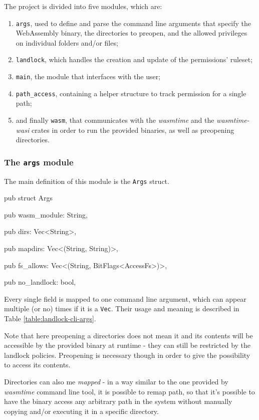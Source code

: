The project is divided into five modules, which are:
\begin{enumerate}
  \item \texttt{args}, used to define and parse the command line arguments that specify the WebAssembly binary,
        the directories to preopen, and the allowed privileges on individual folders and/or files;
  \item \texttt{landlock}, which handles the creation and update of the permissions' ruleset;
  \item \texttt{main}, the module that interfaces with the user;
  \item \texttt{path\_access}, containing a helper structure to track permission for a single path;
  \item and finally \texttt{wasm}, that communicates with the \textit{wasmtime} and the \textit{wasmtime-wasi} crates
        in order to run the provided binaries, as well as preopening directories.
\end{enumerate}

\subsubsection{The \texttt{args} module}

The main definition of this module is the \texttt{Args} struct.

\begin{code}[language=rust]
  pub struct Args {
    pub wasm_module: String,

    pub dirs: Vec<String>,

    pub mapdirs: Vec<(String, String)>,

    pub fs_allows: Vec<(String, BitFlags<AccessFs>)>,

    pub no_landlock: bool,
  }
\end{code}

Every single field is mapped to one command line argument, which can appear multiple (or no) times
if it is a \texttt{Vec}. Their usage and meaning is described in Table \ref{table:landlock-cli-args}.

Note that here preopening a directories does not mean it and its contents will be accessible by the
provided binary at runtime - they can still be restricted by the landlock policies. Preopening is
necessary though in order to give the possibility to access its contents.

Directories can also me \textit{mapped} - in a way similar to the one provided by \textit{wasmtime} command line tool,
it is possible to remap path, so that it's possible to have the binary access any arbitrary path in the system
without manually copying and/or executing it in a specific directory.

